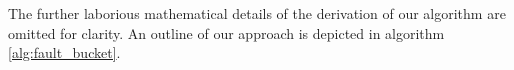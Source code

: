 \documentclass[letterpaper]{article}
\newcommand{\given}{\!\ensuremath{\mid}\!}
\newcommand{\cm}[1]{\ensuremath{\mathcal{#1}}}
\newcommand{\bm}[1]{\ensuremath{\mathbf{#1}}}
\newcommand{\data}{\ensuremath{\cm{D}}}
\newcommand{\vect}[1]{\bm{#1}}
\newcommand{\vy}{\vect{y}}
\newcommand{\vs}{\vect{\sigma}}
\newcommand{\p}[2]{p(#1\given#2)}
\newcommand{\fPr}{p}
\newcommand{\Prob}[2]{\fPr(#1 \given #2 )}
\newcommand{\ps}[2]{p(#1\vert#2)}
\newcommand{\mean}[2]{{m}(#1\given#2)}
\newcommand{\cov}[2]{{C}(#1\given#2)}
\newcommand{\N}[3]{\cm{N}( #1;#2,#3 )}
\newcommand{\st}{_{\star}}
\DeclareMathOperator{\fault}{fault}
\begin{document}
The further laborious mathematical details of the derivation of our algorithm are omitted for clarity. An outline of our approach is depicted in algorithm \ref{alg:fault_bucket}.

\end{document}

